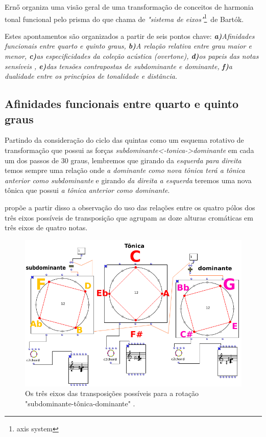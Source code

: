 \documentclass[
	12pt,				%
	openright,			%
	twoside,			%
	a4paper,			%
	english,			%
	french,				%
	spanish,			%
	brazil				%
	]{abntex2}
\begin{document}
Ern{\H{o}}  organiza uma visão geral de uma transformação de conceitos de harmonia tonal funcional pelo prisma do que chama de \textit{"sistema de eixos"}\footnote{axis system}\ de Bartók. \pagebreak

Estes apontamentos são organizados a partir de seis pontos chave: \textit{\textbf{a)}Afinidades funcionais entre quarto e quinto graus,\textbf{ b)}A relação relativa entre grau maior e menor, \textbf{c)}as especificidades da coleção acústica (overtone), \textbf{d)}os papeis das notas sensíveis , \textbf{e)}das tensões contrapostas de subdominante e dominante, \textbf{f)}a dualidade entre os princípios de tonalidade e distância.}

\subsection{Afinidades funcionais entre quarto e quinto graus}

Partindo da consideração do ciclo das quintas como um esquema rotativo de transformação que possui as forças \textit{subdominante<-tonica->dominante} em cada um dos passos de 30 graus, lembremos que girando da \textit{esquerda para direita} temos sempre uma relação onde \textit{a dominante como nova tônica terá a tônica anterior como subdominante} e girando \textit{da direita a esquerda} teremos uma nova tônica que possui \textit{a tônica anterior como dominante}. 

 propõe a partir disso a observação do uso das relações entre os quatro pólos dos três eixos possíveis de transposição que agrupam as doze alturas cromáticas em três eixos de quatro notas. 

\begin{figure}[!h]
	\caption{\label{fig_grafico}Os três eixos das transposições possíveis para a rotação "subdominante-tônica-dominante" .}
	\begin{center}
	    \includegraphics[scale=0.45]{axis/axisOM.png}
	\end{center}
\end{figure}
\end{document}
